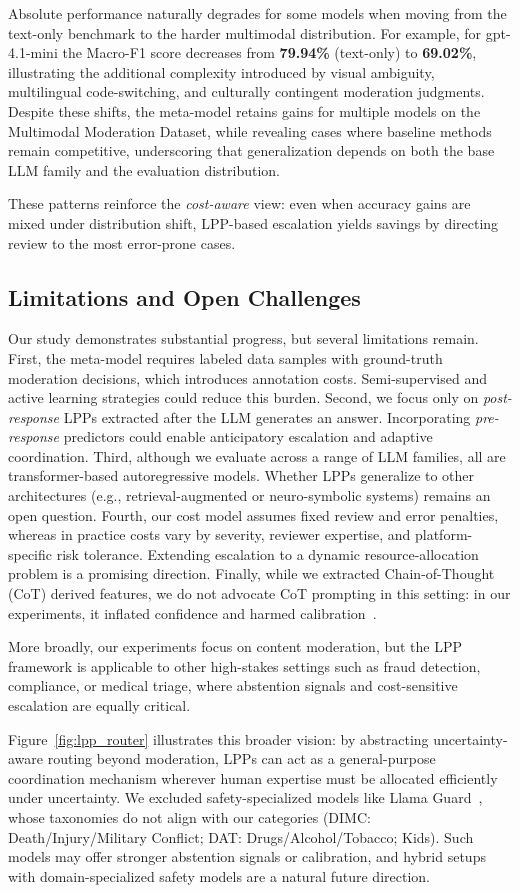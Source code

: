 Absolute performance naturally degrades for some models when moving from the text-only benchmark to the harder multimodal distribution. For example, for gpt-4.1-mini the Macro-F1 score decreases from \textbf{79.94\%} (text-only) to \textbf{69.02\%}, illustrating the additional complexity introduced by visual ambiguity, multilingual code-switching, and culturally contingent moderation judgments. Despite these shifts, the meta-model retains gains for multiple models on the Multimodal Moderation Dataset, while revealing cases where baseline methods remain competitive, underscoring that generalization depends on both the base LLM family and the evaluation distribution.

These patterns reinforce the \emph{cost-aware} view: even when accuracy gains are mixed under distribution shift, LPP-based escalation yields savings by directing review to the most error-prone cases.
\subsection{Limitations and Open Challenges}
\label{subsec:limitations}
Our study demonstrates substantial progress, but several limitations remain. First, the meta-model requires labeled data samples with ground-truth moderation decisions, which introduces annotation costs. Semi-supervised and active learning strategies could reduce this burden. Second, we focus only on \emph{post-response} LPPs extracted after the LLM generates an answer. Incorporating \emph{pre-response} predictors could enable anticipatory escalation and adaptive coordination.
Third, although we evaluate across a range of LLM families, all are transformer-based autoregressive models. Whether LPPs generalize to other architectures (e.g., retrieval-augmented or neuro-symbolic systems) remains an open question. Fourth, our cost model assumes fixed review and error penalties, whereas in practice costs vary by severity, reviewer expertise, and platform-specific risk tolerance. Extending escalation to a dynamic resource-allocation problem is a promising direction.
Finally, while we extracted Chain-of-Thought (CoT) derived features, we do not advocate CoT prompting in this setting: in our experiments, it inflated confidence and harmed calibration~\cite{tian+al:23,zhang2024studycalibrationincontextlearning}.

More broadly, our experiments focus on content moderation, but the LPP framework is applicable to other high-stakes settings such as fraud detection, compliance, or medical triage, where abstention signals and cost-sensitive escalation are equally critical.

Figure~\ref{fig:lpp_router} illustrates this broader vision: by abstracting uncertainty-aware routing beyond moderation, LPPs can act as a general-purpose coordination mechanism wherever human expertise must be allocated efficiently under uncertainty.
We excluded safety-specialized models like Llama Guard~\cite{Inan2023LlamaGL}, whose taxonomies do not align with our categories (DIMC: Death/Injury/Military Conflict; DAT: Drugs/Alcohol/Tobacco; Kids). Such models may offer stronger abstention signals or calibration, and hybrid setups with domain-specialized safety models are a natural future direction.